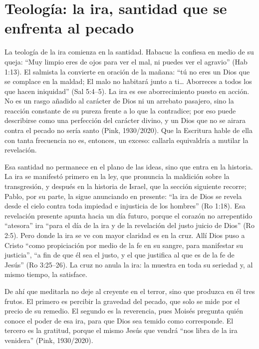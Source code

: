 \documentclass[11pt,letterpaper]{article}
\begin{document}
\section{Teología: la ira, santidad que se enfrenta al pecado}

La teología de la ira comienza en la santidad. Habacuc la confiesa en medio de su queja: ``Muy limpio eres de ojos para ver el mal, ni puedes ver el agravio'' (Hab 1:13). El salmista la convierte en oración de la mañana: ``tú no eres un Dios que se complace en la maldad; El malo no habitará junto a ti\ldots{} Aborreces a todos los que hacen iniquidad'' (Sal 5:4--5). La ira es ese aborrecimiento puesto en acción. No es un rasgo añadido al carácter de Dios ni un arrebato pasajero, sino la reacción constante de su pureza frente a lo que la contradice; por eso puede describirse como una perfección del carácter divino, y un Dios que no se airara contra el pecado no sería santo (Pink, 1930/2020). Que la Escritura hable de ella con tanta frecuencia no es, entonces, un exceso: callarla equivaldría a mutilar la revelación.

Esa santidad no permanece en el plano de las ideas, sino que entra en la historia. La ira se manifestó primero en la ley, que pronuncia la maldición sobre la transgresión, y después en la historia de Israel, que la sección siguiente recorre; Pablo, por su parte, la sigue anunciando en presente: ``la ira de Dios se revela desde el cielo contra toda impiedad e injusticia de los hombres'' (Ro 1:18). Esa revelación presente apunta hacia un día futuro, porque el corazón no arrepentido ``atesora'' ira ``para el día de la ira y de la revelación del justo juicio de Dios'' (Ro 2:5). Pero donde la ira se ve con mayor claridad es en la cruz. Allí Dios puso a Cristo ``como propiciación por medio de la fe en su sangre, para manifestar su justicia'', ``a fin de que él sea el justo, y el que justifica al que es de la fe de Jesús'' (Ro 3:25--26). La cruz no anula la ira: la muestra en toda su seriedad y, al mismo tiempo, la satisface.

De ahí que meditarla no deje al creyente en el terror, sino que produzca en él tres frutos. El primero es percibir la gravedad del pecado, que solo se mide por el precio de su remedio. El segundo es la reverencia, pues Moisés pregunta quién conoce el poder de esa ira, para que Dios sea temido como corresponde. El tercero es la gratitud, porque el mismo Jesús que vendrá ``nos libra de la ira venidera'' (Pink, 1930/2020).
\end{document}
